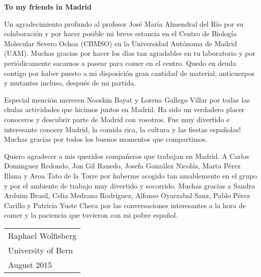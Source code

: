 \begin{addmargin}{0.025\textwidth}
\newpage
 
\Large\textbf{To my friends in Madrid}

\normalsize
\par\bigskip
\noindent 
Un agradecimiento profundo al profesor José María Almendral del Río por su colaboración y por hacer posible mi breve estancia en el Centro de Biología Molecular Severo Ochoa (CBMSO) en la Universidad Autónoma de Madrid (UAM). Muchas gracias por hacer los días tan agradables en tu laboratorio y por periódicamente sacarnos a pasear para comer en el centro. Quedo en deuda contigo por haber puesto a mi disposición gran cantidad de material, anticuerpos y mutantes incluso, después de mi partida.

\par\medskip 
\noindent
Especial mención merecen Nooshin Bayat y Lorena Gallego Villar por todas las chulas actividades que hicimos juntos en Madrid. Ha sido un verdadero placer conoceros y descubrir parte de Madrid con vosotros. Fue muy divertido e interesante conocer Madrid, la comida rica, la cultura y las fiestas españolas! Muchas gracias por todos los buenos momentos que compartimos.
   
\par\medskip 
\noindent   
Quiero agradecer a mis queridos compañeros que trabajan en Madrid. A Carlos Dominguez Redondo, Jon Gil Ranedo, Josefa González Nicolás, Marta Pérez Illana y Aroa Tato de la Torre por haberme acogido tan amablemente en el grupo y por el ambiente de trabajo muy divertido y socorrido. Muchas gracias a Sandra Arduim Brasil, Celia Medrano Rodríguez, Alfonso Oyarzabal Sanz, Pablo Pérez Carillo y Patricia Yuste Checa por las conversaciones interesantes a la hora de comer y la paciencia que tuvieron con mi pobre español.      
\end{addmargin}

 
\par\bigskip
\par\bigskip
\par\bigskip
\par\bigskip
\noindent \hfill\begin{tabular}{l}
Raphael Wolfisberg\\
University of Bern\\
August 2015\\
\end{tabular}

